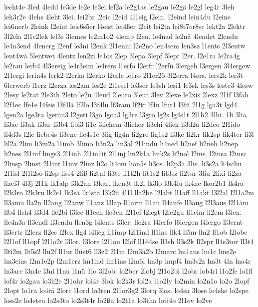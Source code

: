 {lecht4e
3led
4ledd
le3de
le2e
le3ei
lef2a
le2g1as
le2gau
le2gä
le2gl
leg4r
3leh
leh3r2e
4lehs
4leht
3lei.
lei2br
l2eic
l2eid
4l1eig
l2ein.
l2eind
lein4du
l2eine
lei6nerb
2leink
l2eint
leis6s5er
l4eist
lei4ßer
l2eit
lei2ta
lei8t7er8sc
lekt2a
2lektr
3l2ela
2l1e2lek
lel3s
3lemes
le2m1o2
4lemp
l2en.
le4nad
le2nä
4lendet
2lendu
le4n3end
4lenerg
l2enf
le3ni
l2enk
2l1enni
l2e2no
len4sem
len3sz
l1ents
2l3entw
lent4wä
5lentwet
4lentz
len2zi
le1os
2lep
3lepa
3lepf
3lepr
l2er.
l2e1ra
le2ra4g
le2rau
lerb4
4l3ereig
le4r3eim
le4rers
l1erfo
l2erfr
l2erfü
3lergeh
l3ergen
3l4ergew
2l1ergi
lerin4s
lerk2
l2erka
l2erko
l2erle
le1ro
2l1er2ö
3l2erra
l4ers.
lers2k
ler3t
6lerwerb
l1erz
l2erza
les2am
les2e
2l1esel
le3ser
le3sh
lesi1
le3sk
les3s
leste3
4lesw
2lesy
le2tat
2le3th
2leto
le2u
4leud
2leuro
3leut
3lev
2lexe
le2xis
2lexz
2l1f
l3fah
l2f1ec
lfe1e
l4feis
l3f4lä
lf3lo
l3f4lu
lf3ram
lf2tr
lf4u
lfur1
l3fü
2l1g
lga3t
lgd4
lgen2a
lge3ra
lgeräu3
l2geti
l3go
lgoa3
lg3re
l3gro
lg2s
lg4s1t
2l1h2
3lhi.
1li
3lia
li3ac
li3ak
li3ar
li3b4
libi3
li1c
3lichem
3licher
li3chi
4lick
li3d2a
li2deo
2l1ido
li4d3s
l2ie
liebe4s
li3ene
lie4s1c
3lig
lig4n
li2gre
lig1s2
li3ke
li2kr
lik2sp
lik4ter
li3l
lil2a
2lim
li3m2a
l1imb
3limo
li3n2a
lin3al
2l1indu
li4ned
li2nef
li2neh
li2nep
li2nes
2l1inf
lings3
2l1inh
2l1in1it
2l1inj
lin2k1a
link2s
li2nol
l2ins.
l2insa
l2insc
2linsp
2linst
2l1int
l1inv
2linz
li2o
li4om
lion5s
li3os.
li2p3a
3lis.
li3s2a
li4schu
2l1isl
2l1i2so
li2sp
liss4
2liß
li2tal
li3te
li1t2h
lit1s2
lit3sz
li2tur
3liu
2lixi
li2za
lizei3
4l3j
2l1k
lk1alp
l3k2an
l3kar.
lken3t
lk2l
lk3lo
l3k4lu
lk4ne
lkor2b1
lk4ra
l2k3ro
l2k3ru
lk2s1
lk3sä
lk4stä
l3k2ü
4l1l
lla2be
l2labt
ll1aff
ll1akt
l3l2al
l2l1a2m
ll3ama
lla2n
ll2ang
ll2anw
ll1anz
l3lap
ll1arm
ll1au
ll4aufe
ll3aug
l2l3aus
l2l1äm
llb4
llch4
ll3d4
lle2bi
l3lec
ll1ech
lle3en
l2l1ef
l2legt
l2le2gu
ll1eim
ll2em
l3len.
lle4n3a
ll3endl
ll3endu
llen3g
l4lents
l3ler.
lle2ra
l4lerfo
l6lergen
l4lergo
ll3ernt
ll3ertr
l2lerz
ll2es
l2lex
llg4
l4lieg
ll1imp
l2l1ind
ll1ins
llk4
ll5m
lln2
ll1ob
l2lobe
l2l1of
ll1opf
l2l1o2r
l3lor.
l3lore
l2l1ou
l2löf
ll1ö4se
ll3sh
ll3s2k
ll2spr
ll4s3tor
ll3t4
llti2m
llt5s2
llu2f
ll1ur
llust6
ll3z2
2l1m
l2m3a2b
l2marc
lm1aus
lm1c
lme2e
lm3eins
l2m1e2p
l2m1erz
lm1ind
lm1ins
l2möl
lm3p
lmpf4
lm3s2z
lm3t
4ln
lna4r
ln3are
l3n4e
l3ni
l1nu
l1nü
1lo
3l2ob.
lo2ber
2lobj
2l1o2bl
l2obr
lob4ri
l1o2fe
lo1fl
lof4r
lo2gau
lo3h2e
2l1ohr
loi4r
3lok
lo2k3r
lol2a
l1o2ly
lo2min
lo2n1o
lo2o
2lopf
2lopt
lo1ra
lo4rä
2lorc
l1ord
lo3ren
2l1or3g2
3lorq
3los.
lo4sa
3lose
lo4ske
lo2spe
loss2e
lo4steu
lo2s3to
lo2s3t4r
lo2ßu
lo2t1a
lo3tha
loti4o
2l1ov
lo2ve
}
